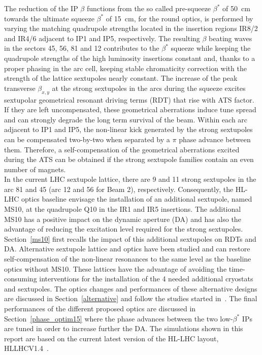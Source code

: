 \documentclass{cernatsnote}
\begin{document}
The reduction of the IP $\beta$ functions from the so called pre-squeeze $\beta^{*}$ of 50~cm towards the ultimate squeeze $\beta^{*}$ of 15~cm, for the round optics, is performed by varying the matching quadrupole strengths located in the insertion regions IR8/2 and IR4/6 adjacent to IP1 and IP5, respectively. The resulting $\beta$ beating waves in the sectors 45, 56, 81 and 12 contributes to the $\beta^{*}$ squeeze while keeping the quadrupole strengths of the high luminosity insertions constant and, thanks to a proper phasing in the arc cell, keeping stable chromaticity correction with the strength of the lattice sextupoles nearly constant. The increase of the peak transverse $\beta_{x,y}$ at the strong sextupoles in the arcs during the squeeze excites sextupolar geometrical resonant driving terms (RDT) that rise with ATS factor. If they are left uncompensated, these geometrical aberrations induce tune spread and can strongly degrade the long term survival of the beam. Within each arc adjacent to IP1 and IP5, the non-linear kick generated by the strong sextupoles can be compensated two-by-two when separated by a $\pi$ phase advance between them. Therefore, a self-compensation of the geometrical aberrations excited during the ATS can be obtained if the strong sextupole families contain an even number of magnets.\\

In the current LHC sextupole lattice, there are 9 and 11 strong sextupoles in the arc 81 and 45 (arc 12 and 56 for Beam 2), respectively. Consequently, the HL-LHC optics baseline envisage the installation of an additional sextupole, named MS10, at the quadrupole Q10 in the IR1 and IR5 insertions. The additional MS10 has a positive impact on the dynamic aperture (DA) and has also the advantage of reducing the excitation level required for the strong sextupoles. Section~\ref{ms10} first recalls the impact of this additional sextupoles on RDTs and DA. Alternative sextupole lattice and optics have been studied and can restore self-compensation of the non-linear resonances to the same level as the baseline optics without MS10. These lattices have the advantage of avoiding the time-consuming interventions for the installation of the 4 needed additional cryostats and sextupoles. The optics changes and performances of these alternative designs are discussed in Section~\ref{alternative} and follow the studies started in~\cite{slhcv3,ms10_ppt1,ms10_ppt2}. The final performances of the different proposed optics are discussed in Section~\ref{phase_optim15} where the phase advances between the two low-$\beta^{*}$ IPs are tuned in order to increase further the DA. The simulations shown in this report are based on the current latest version of the HL-LHC layout, HLLHCV1.4~\cite{hllhcv14}.
\end{document}
